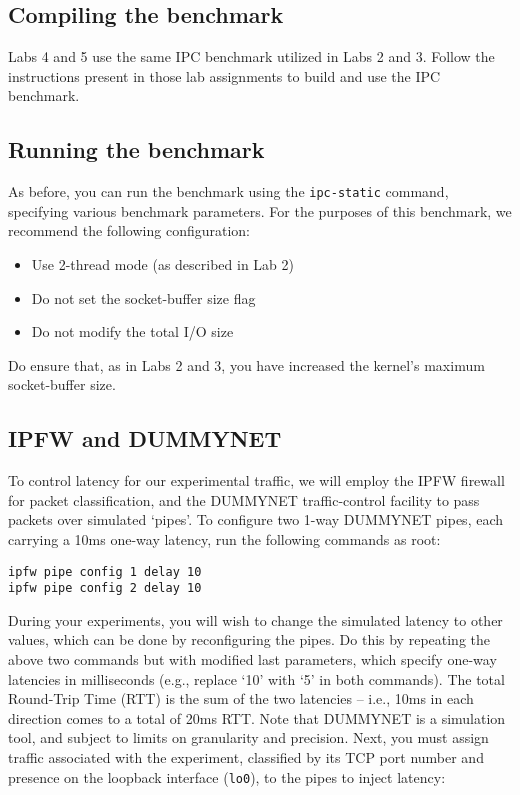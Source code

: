 \documentclass[a4paper,10pt]{article}
\begin{document}
\subsection*{Compiling the benchmark}

Labs 4 and 5 use the same IPC benchmark utilized in Labs 2 and 3.
Follow the instructions present in those lab assignments to build and use the
IPC benchmark.

\subsection*{Running the benchmark}

As before, you can run the benchmark using the \texttt{ipc-static} command,
specifying various benchmark parameters.
For the purposes of this benchmark, we recommend the following configuration:

\begin{itemize}
\item Use 2-thread mode (as described in Lab 2)
\item Do not set the socket-buffer size flag
\item Do not modify the total I/O size
\end{itemize}

\noindent
Do ensure that, as in Labs 2 and 3, you have increased the kernel's maximum 
socket-buffer size.

\subsection*{IPFW and DUMMYNET}

To control latency for our experimental traffic, we will employ the IPFW
firewall for packet classification, and the DUMMYNET traffic-control facility
to pass packets over simulated `pipes'.
To configure two 1-way DUMMYNET pipes, each carrying a 10ms one-way latency,
run the following commands as root:

\begin{verbatim}
ipfw pipe config 1 delay 10
ipfw pipe config 2 delay 10
\end{verbatim}

\noindent
During your experiments, you will wish to change the simulated latency to
other values, which can be done by reconfiguring the pipes.
Do this by repeating the above two commands but with modified last parameters,
which specify one-way latencies in milliseconds (e.g., replace `10' with `5'
in both commands).
The total Round-Trip Time (RTT) is the sum of the two latencies -- i.e., 10ms
in each direction comes to a total of 20ms RTT.
Note that DUMMYNET is a simulation tool, and subject to limits on granularity
and precision.
Next, you must assign traffic associated with the experiment, classified by
its TCP port number and presence on the loopback interface (\texttt{lo0}), to
the pipes to inject latency:
\end{document}
